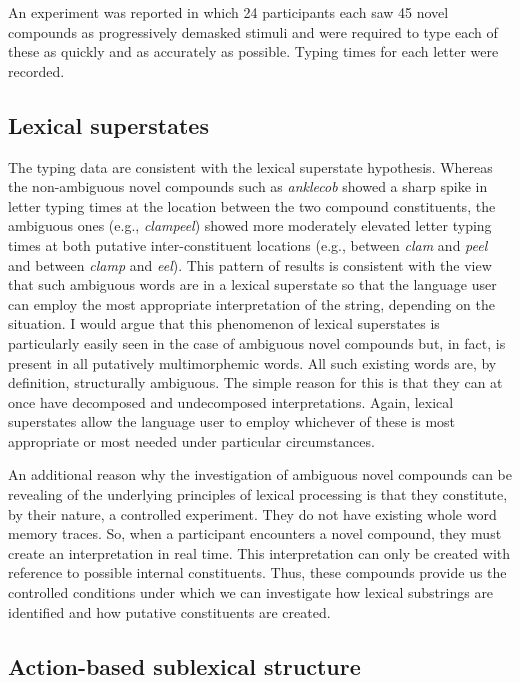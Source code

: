 \documentclass[output=paper]{langsci/langscibook}
\begin{document}
An experiment was reported in which 24 participants each saw 45 novel compounds as progressively demasked stimuli and were required to type each of these as quickly and as accurately as possible. Typing times for each letter were recorded.

\subsection{Lexical superstates}\label{sec:libben:4.1}

The typing data are consistent with the lexical superstate hypothesis.  Whereas the non-ambiguous novel compounds such as \textit{anklecob} showed a sharp spike in letter typing times at the location between the two compound constituents, the ambiguous ones (e.g., \textit{clampeel}) showed more moderately elevated letter typing times at both putative inter-constituent locations (e.g., between \textit{clam} and \textit{peel} and between \textit{clamp} and \textit{eel}). This pattern of results is consistent with the view that such ambiguous words are in a lexical superstate so that the language user can employ the most appropriate interpretation of the string, depending on the situation.  I would argue that this phenomenon of lexical superstates is particularly easily seen in the case of ambiguous novel compounds but, in fact, is present in all putatively multimorphemic words. All such existing words are, by definition, structurally ambiguous. The simple reason for this is that they can at once have decomposed and undecomposed interpretations.  Again, lexical superstates allow the language user to employ whichever of these is most appropriate or most needed under particular circumstances.

An additional reason why the investigation of ambiguous novel compounds can be revealing of the underlying principles of lexical processing is that they constitute, by their nature, a controlled experiment.  They do not have existing whole word memory traces. So, when a participant encounters a novel compound, they must create an interpretation in real time. This interpretation can only be created with reference to possible internal constituents. Thus, these compounds provide us the controlled conditions under which we can investigate how lexical substrings are identified and how putative constituents are created.

\subsection{Action-based sublexical structure}\label{sec:libben:4.2}
\end{document}
